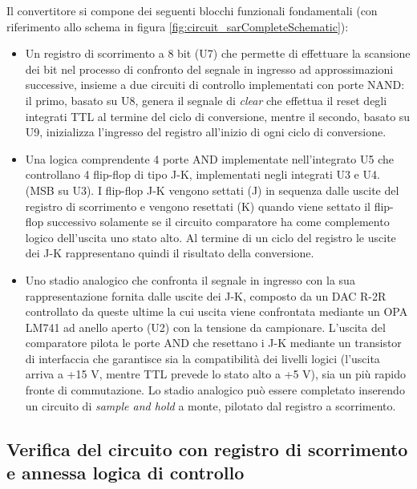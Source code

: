 \documentclass[journal]{IEEEtran}
\begin{document}
Il convertitore si compone dei seguenti blocchi funzionali fondamentali (con riferimento allo schema in figura \ref{fig:circuit_sarCompleteSchematic}):
\begin{itemize}
    \item Un registro di scorrimento a 8 bit (U7) che permette di effettuare la scansione dei bit nel processo di confronto del segnale in ingresso ad approssimazioni successive, insieme a due circuiti di controllo implementati con porte NAND: il primo, basato su U8, genera il segnale di \textit{clear} che effettua il reset degli integrati TTL al termine del ciclo di conversione, mentre il secondo, basato su U9, inizializza l'ingresso del registro all'inizio di ogni ciclo di conversione.
    \item Una logica comprendente 4 porte AND implementate nell'integrato U5 che controllano 4 flip-flop di tipo J-K, implementati negli integrati U3 e U4. (MSB su U3). I flip-flop J-K vengono settati (J) in sequenza dalle uscite del registro di scorrimento e vengono resettati (K) quando viene settato il flip-flop successivo solamente se il circuito comparatore ha come complemento logico dell'uscita uno stato alto. Al termine di un ciclo del registro le uscite dei J-K rappresentano quindi il risultato della conversione.
    \item Uno stadio analogico che confronta il segnale in ingresso con la sua rappresentazione fornita dalle uscite dei J-K, composto da un DAC R-2R controllato da queste ultime la cui uscita viene confrontata mediante un OPA LM741 ad anello aperto (U2) con la tensione da campionare. L'uscita del comparatore pilota le porte AND che resettano i J-K mediante un transistor di interfaccia che garantisce sia la compatibilità dei livelli logici (l'uscita arriva a +15 V, mentre TTL prevede lo stato alto a +5 V), sia un più rapido fronte di commutazione. Lo stadio analogico può essere completato inserendo un circuito di \textit{sample and hold} a monte, pilotato dal registro a scorrimento.
    
\end{itemize}
 

\subsection{Verifica del circuito con registro di scorrimento e annessa logica di controllo}
\end{document}
